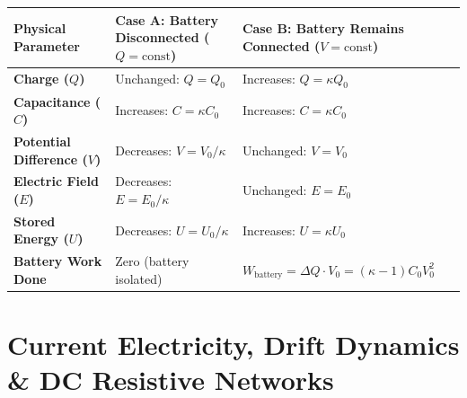 \documentclass[10pt,twoside,openright]{book}
\begin{document}
\begin{usecasebox}
\begin{center}
\begin{tabularx}{\linewidth}{|l|Y|Y|}
\hline
\textbf{Physical Parameter} & \textbf{Case A: Battery Disconnected ($Q = \text{const}$)} & \textbf{Case B: Battery Remains Connected ($V = \text{const}$)} \\
\hline
\textbf{Charge ($Q$)} & Unchanged: $Q = Q_0$ & Increases: $Q = \kappa Q_0$ \\
\hline
\textbf{Capacitance ($C$)} & Increases: $C = \kappa C_0$ & Increases: $C = \kappa C_0$ \\
\hline
\textbf{Potential Difference ($V$)} & Decreases: $V = V_0 / \kappa$ & Unchanged: $V = V_0$ \\
\hline
\textbf{Electric Field ($E$)} & Decreases: $E = E_0 / \kappa$ & Unchanged: $E = E_0$ \\
\hline
\textbf{Stored Energy ($U$)} & Decreases: $U = U_0 / \kappa$ & Increases: $U = \kappa U_0$ \\
\hline
\textbf{Battery Work Done} & Zero (battery isolated) & $W_{\text{battery}} = \Delta Q \cdot V_0 = (\kappa - 1) C_0 V_0^2$ \\
\hline
\end{tabularx}
\end{center}
\end{usecasebox}

\section{Current Electricity, Drift Dynamics \& DC Resistive Networks}
\end{document}

